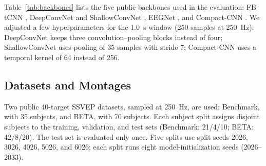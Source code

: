 \documentclass[11pt,a4paper,twoside,asymmetric]{article}
\begin{document}
Table~\ref{tab:backbones} lists the five public backbones used in the evaluation: FB-tCNN \cite{R16}, DeepConvNet and ShallowConvNet \cite{R83}, EEGNet \cite{R84}, and Compact-CNN \cite{R85}. We adjusted a few hyperparameters for the 1.0~s window (250 samples at 250~Hz): DeepConvNet keeps three convolution--pooling blocks instead of four; ShallowConvNet uses pooling of 35 samples with stride 7; Compact-CNN uses a temporal kernel of 64 instead of 256.

\begin{table}[htbp]
\caption{The five backbones and the architectural properties used as explanatory variables in RQ2. ELU: exponential linear unit, a smooth nonlinearity. ``Square, log'': ShallowConvNet's nonlinearity squares its input after the spatial convolution and takes the logarithm after pooling, approximating band-power features. Depthwise: a spatial convolution with one filter per input channel, rather than every filter spanning all channels (ordinary).}
\label{tab:backbones}
\begin{center}
\end{center}
\end{table}
\FloatBarrier

\subsection{Datasets and Montages}
\label{sec:data}

Two public 40-target SSVEP datasets, sampled at 250~Hz, are used: Benchmark, with 35 subjects, and BETA, with 70 subjects. Each subject split assigns disjoint subjects to the training, validation, and test sets (Benchmark: 21/4/10; BETA: 42/8/20). The test set is evaluated only once. Five splits use split seeds 2026, 3026, 4026, 5026, and 6026; each split runs eight model-initialization seeds (2026--2033).
\end{document}
